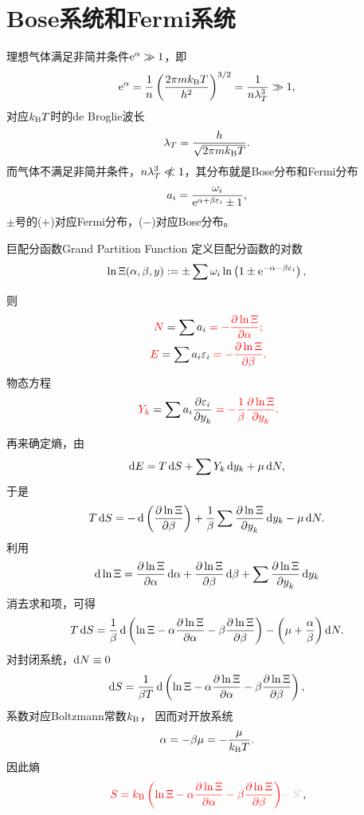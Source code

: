\section{Bose系统和Fermi系统}
理想气体满足非简并条件$\mathop{}\!\mathrm{e}^\alpha\gg 1$，即
\[
	\mathop{}\!\mathrm{e}^\alpha=\frac1n\left(\frac{2\pi mk_{\mathrm B} T}{h^2}\right)^{3/2}=\frac1{n\lambda_T^3}\gg 1,
\]
对应$k_{\mathrm B} T$时的de Broglie波长
\begin{align}\label{T-deB}
	\lambda_T=\frac{h}{\sqrt{2\pi mk_{\mathrm B} T}}.
\end{align}
而气体不满足非简并条件，$n\lambda_T^3\ll\bs{10}/\enspace 1$，其分布就是Bose分布和Fermi分布%
\begin{align}
	a_i=\frac{\omega_i}{\mathop{}\!\mathrm{e}^{\alpha+\beta\varepsilon_i}\pm 1},
\end{align}
$\pm$号的($+$)对应Fermi分布，($-$)对应Bose分布。
\begin{definition}{巨配分函数}{Grand Partition Function}
	定义巨配分函数的对数
	\begin{align}
		\ln\Xi(\alpha,\beta,y):=\pm\sum\omega_i\ln\left(1\pm\mathop{}\!\mathrm{e}^{-\alpha-\beta\varepsilon_i}\right),
	\end{align}
\end{definition}
则
\begin{gather}
	\spark N=\sum a_i\spark{=-\pv{\ln\Xi}{\alpha};}\\ %
	\spark E=\sum a_i\ve_i\spark{=-\pv{\ln\Xi}{\beta}.}
\end{gather}
物态方程
\begin{align}
	\spark{Y_k}=\sum a_i\pv{\ve_i}{y_k}\spark{=-\frac1\beta\pv{\ln\Xi}{y_k}.}
\end{align}

再来确定熵，由
\[
	\mathop{}\!\mathrm{d} E=T\mathop{}\!\mathrm{d} S+\sum Y_k\mathop{}\!\mathrm{d} y_k+\mu\mathop{}\!\mathrm{d} N,
\]
于是
\[
	T\d S=-\d\kh{\pv{\ln\Xi}\beta}+\frac1\beta\sum\pv{\ln\Xi}{y_k}\d y_k-\mu\d N.
\]
利用
\[
	\d\ln\Xi=\pv{\ln\Xi}\alpha\d\alpha+\pv{\ln\Xi}\beta\d\beta+\sum\pv{\ln\Xi}{y_k}\d y_k
\]
消去求和项，可得
\[
	T\d S=\frac1\beta\d\kh{\ln\Xi-\alpha\pv{\ln\Xi}\alpha-\beta\pv{\ln\Xi}\beta}-\kh{\mu+\frac\alpha\beta}\d N.
\]
对封闭系统，$\mathop{}\!\mathrm{d} N\equiv 0$
\[
	\d S=\frac1{\beta T}\d\kh{\ln\Xi-\alpha\pv{\ln\Xi}\alpha-\beta\pv{\ln\Xi}\beta},
\]
系数对应Boltzmann常数$k_{\mathrm B}$，
因而对开放系统
\begin{align}\label{Bose-mu}
	\alpha=-\beta\mu=-\frac\mu{k_{\mathrm B} T}.
\end{align}
因此熵
\begin{align}
	\spark{S=\kB\kh{\ln\Xi-\alpha\pv{\ln\Xi}\alpha-\beta\pv{\ln\Xi}\beta}}{\color[gray]{.8}-\,S'},
\end{align}

